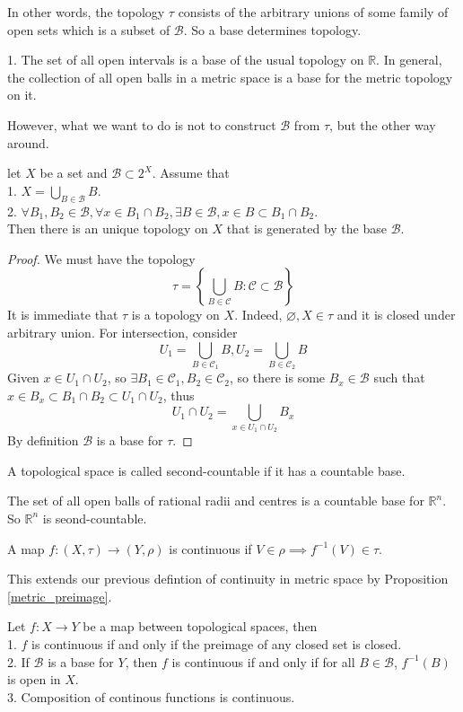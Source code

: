 In other words, the topology $\tau$ consists of the arbitrary unions of some family of open sets which is a subset of $\mathscr B$.
So a base determines topology.
\begin{example}
    1. The set of all open intervals is a base of the usual topology on $\mathbb R$.
    In general, the collection of all open balls in a metric space is a base for the metric topology on it.
\end{example}
However, what we want to do is not to construct $\mathscr B$ from $\tau$, but the other way around.
\begin{lemma}
    let $X$ be a set and $\mathscr B\subset 2^X$.
    Assume that\\
    1. $X=\bigcup_{B\in\mathscr B}B$.\\
    2. $\forall B_1,B_2\in\mathscr B,\forall x\in B_1\cap B_2, \exists B\in\mathscr B,x\in B\subset B_1\cap B_2$.\\
    Then there is an unique topology on $X$ that is generated by the base $\mathscr B$.
\end{lemma}
\begin{proof}
    We must have the topology
    $$\tau=\left\{\bigcup_{B\in\mathscr C}B:\mathscr C\subset\mathscr B\right\}$$
    It is immediate that $\tau$ is a topology on $X$.
    Indeed, $\varnothing,X\in\tau$ and it is closed under arbitrary union.
    For intersection, consider
    $$U_1=\bigcup_{B\in\mathscr C_1}B,U_2=\bigcup_{B\in\mathscr C_2}B$$
    Given $x\in U_1\cap U_2$, so $\exists B_1\in\mathscr C_1, B_2\in\mathscr C_2$, so there is some $B_x\in\mathscr B$ such that $x\in B_x\subset B_1\cap B_2\subset U_1\cap U_2$, thus
    $$U_1\cap U_2=\bigcup_{x\in U_1\cap U_2}B_x$$
    By definition $\mathscr B$ is a base for $\tau$.
\end{proof}
\begin{definition}
    A topological space is called second-countable if it has a countable base.
\end{definition}
\begin{example}
    The set of all open balls of rational radii and centres is a countable base for $\mathbb R^n$.
    So $\mathbb R^n$ is seond-countable.
\end{example}
\begin{definition}
    A map $f:(X,\tau)\to (Y,\rho)$ is continuous if $V\in\rho\implies f^{-1}(V)\in\tau$.
\end{definition}
This extends our previous defintion of continuity in metric space by Proposition \ref{metric_preimage}.
\begin{proposition}
    Let $f:X\to Y$ be a map between topological spaces, then\\
    1. $f$ is continuous if and only if the preimage of any closed set is closed.\\
    2. If $\mathscr B$ is a base for $Y$, then $f$ is continuous if and only if for all $B\in\mathscr B$, $f^{-1}(B)$ is open in $X$.\\
    3. Composition of continous functions is continuous.
\end{proposition}
